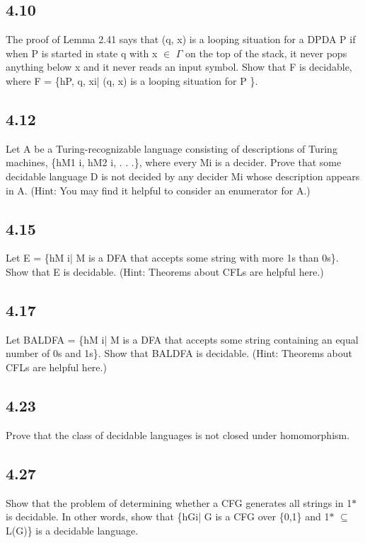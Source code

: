 \subsection*{4.10}

The proof of Lemma 2.41 says that (q, x) is a looping situation for a DPDA P if when P is started in state q with x $\in$ $\Gamma$ on the top of the stack, it never pops anything below x and it never reads an input symbol. Show that F is decidable, where F = \{hP, q, xi| (q, x) is a looping situation for P \}.


\subsection*{4.12}

Let A be a Turing-recognizable language consisting of descriptions of Turing machines, \{hM1 i, hM2 i, . . .\}, where every Mi is a decider. Prove that some decidable language D is not decided by any decider Mi whose description appears in A. (Hint: You may find it helpful to consider an enumerator for A.)


\subsection*{4.15}

Let E = \{hM i| M is a DFA that accepts some string with more 1s than 0s\}. Show that E is decidable. (Hint: Theorems about CFLs are helpful here.)


\subsection*{4.17}

Let BALDFA = \{hM i| M is a DFA that accepts some string containing an equal number of 0s and 1s\}. Show that BALDFA is decidable. (Hint: Theorems about CFLs are helpful here.)


\subsection*{4.23}

Prove that the class of decidable languages is not closed under homomorphism.


\subsection*{4.27}

Show that the problem of determining whether a CFG generates all strings in 1$\ast$ is decidable. In other words, show that \{hGi| G is a CFG over \{0,1\} and 1$\ast$ $\subseteq$ L(G)\} is a decidable language.


\clearpage
